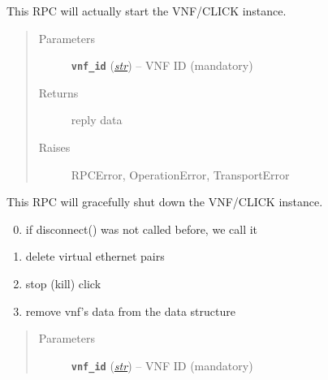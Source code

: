 \documentclass[letterpaper,10pt,english]{sphinxmanual}
\begin{document}
\begin{fulllineitems}

\begin{fulllineitems}
\label{adapt/domain_adapters:escape.adapt.domain_adapters.VNFStarterAdapter.startVNF}
This RPC will actually start the VNF/CLICK instance.
\begin{quote}\begin{description}
\item[{Parameters}] \leavevmode
\textbf{\texttt{vnf\_id}} (\href{https://docs.python.org/2.7/library/functions.html\#str}{\emph{str}}) -- VNF ID (mandatory)

\item[{Returns}] \leavevmode
reply data

\item[{Raises}] \leavevmode
RPCError, OperationError, TransportError

\end{description}\end{quote}

\end{fulllineitems}


\begin{fulllineitems}
\label{adapt/domain_adapters:escape.adapt.domain_adapters.VNFStarterAdapter.stopVNF}
This RPC will gracefully shut down the VNF/CLICK instance.
\begin{enumerate}
\setcounter{enumi}{-1}
\item {} 
if disconnect() was not called before, we call it

\item {} 
delete virtual ethernet pairs

\item {} 
stop (kill) click

\item {} 
remove vnf's data from the data structure

\end{enumerate}
\begin{quote}\begin{description}
\item[{Parameters}] \leavevmode
\textbf{\texttt{vnf\_id}} (\href{https://docs.python.org/2.7/library/functions.html\#str}{\emph{str}}) -- VNF ID (mandatory)


\end{description}
\end{quote}
\end{fulllineitems}
\end{fulllineitems}
\end{document}
